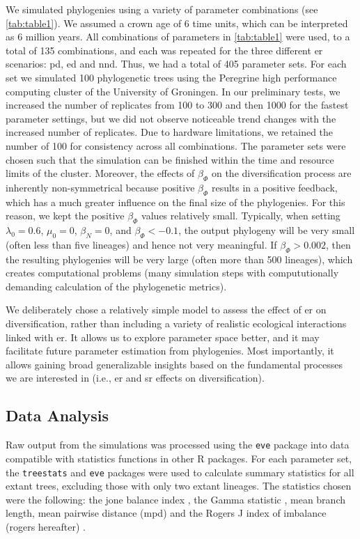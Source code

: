 {We simulated phylogenies using a variety of parameter combinations (see \autoref{tab:table1}). We assumed a crown age of 6 time units, which can be interpreted as 6 million years. All combinations of parameters in \autoref{tab:table1} were used, to a total of 135 combinations, and each was repeated for the three different \acrshort{er} scenarios: \acrshort{pd}, \acrshort{ed} and \acrshort{nnd}. Thus, we had a total of 405 parameter sets. For each set we simulated 100 phylogenetic trees using the Peregrine high performance computing cluster of the University of Groningen. In our preliminary tests, we increased the number of replicates from 100 to 300 and then 1000 for the fastest parameter settings, but we did not observe noticeable trend changes with the increased number of replicates. Due to hardware limitations, we retained the number of 100 for consistency across all combinations. The parameter sets were chosen such that the simulation can be finished within the time and resource limits of the cluster. Moreover, the effects of $\beta_\varPhi$ on the diversification process are inherently non-symmetrical because positive $\beta_\varPhi$ results in a positive feedback, which has a much greater influence on the final size of the phylogenies. For this reason, we kept the positive $\beta_\varPhi$ values relatively small. Typically, when setting $\lambda_0 = 0.6$, $\mu_0 = 0$, $\beta_N = 0$, and $\beta_\varPhi < -0.1$, the output phylogeny will be very small (often less than five lineages) and hence not very meaningful. If $\beta_\varPhi > 0.002$, then the resulting phylogenies will be very large (often more than 500 lineages), which creates computational problems (many simulation steps with compututionally demanding calculation of the phylogenetic metrics).

We deliberately chose a relatively simple model to assess the effect of \acrshort{er} on diversification, rather than including a variety of realistic ecological interactions linked with \acrshort{er}. It allows us to explore parameter space better, and it may facilitate future parameter estimation from phylogenies. Most importantly, it allows gaining broad generalizable insights based on the fundamental processes we are interested in (i.e., \acrshort{er} and \acrshort{sr} effects on diversification).

\subsection{Data Analysis}
\label{ch1::sec::methods::data_analysis}
Raw output from the simulations was processed using the \texttt{eve} package into data compatible with statistics functions in other R packages. For each parameter set, the \texttt{treestats} \citep{janzen_phylogenetic_2024} and \texttt{eve} packages were used to calculate summary statistics for all extant trees, excluding those with only two extant lineages. The statistics chosen were the following: the \acrshort{jone} balance index \citep{lemant_robust_2022}, the Gamma statistic \citep{pybus_testing_2000}, mean branch length, mean pairwise distance (\acrshort{mpd}) \citep{webb_phylogenies_2002} and the Rogers J index of imbalance (\acrshort{rogers} hereafter) \citep{rogers_central_1996}. 

}
